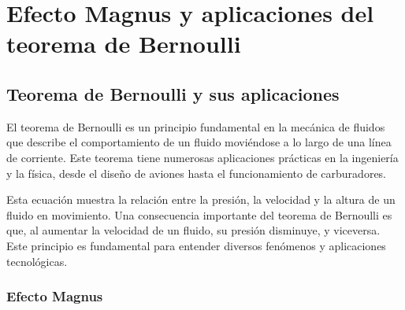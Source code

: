 \documentclass[../main]{subfiles}
\begin{document}
\chapter{Efecto Magnus y aplicaciones del teorema de Bernoulli}

\section{Teorema de Bernoulli y sus aplicaciones}

El teorema de Bernoulli es un principio fundamental en la mecánica de fluidos que describe el comportamiento de un fluido moviéndose a lo largo de una línea de corriente. Este teorema tiene numerosas aplicaciones prácticas en la ingeniería y la física, desde el diseño de aviones hasta el funcionamiento de carburadores.


Esta ecuación muestra la relación entre la presión, la velocidad y la altura de un fluido en movimiento. Una consecuencia importante del teorema de Bernoulli es que, al aumentar la velocidad de un fluido, su presión disminuye, y viceversa. Este principio es fundamental para entender diversos fenómenos y aplicaciones tecnológicas.

\subsection{Efecto Magnus}
\end{document}
